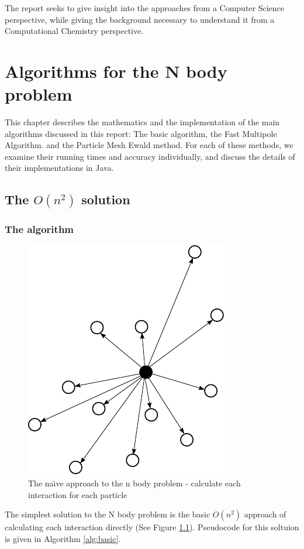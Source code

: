 \documentclass[pdftex,twoside,a4paper]{report}
\newcommand{\bcen}{\begin{center}}
\newcommand{\ecen}{\end{center}}
\newcommand{\pmem}{Particle Mesh Ewald method}
\newcommand{\fma}{Fast Multipole Algorithm}
\begin{document}
    The report seeks to give insight into the approaches from a Computer Science perspective, while giving the background necessary to understand it from a Computational Chemistry perspective.
    
    
    

\chapter{Algorithms for the N body problem}
This chapter describes the mathematics and the implementation of the main algorithms discussed in this report: The basic algorithm, the \fma{}. and the \pmem{}. For each of these methods, we examine their running times and accuracy individually, and discuss the details of their implementations in Java.
\section{The $O(n^2)$ solution}
\subsection{The algorithm}
        
\begin{figure}
\bcen \includegraphics{figures/nbodies.pdf} \ecen
\caption{The na\"{\i}ve approach to the n body problem - calculate each interaction for each particle}
\label{fig:basic_alg_diag}
\end{figure}

The simplest solution to the N body problem is the basic $O(n^2)$ approach of calculating each interaction directly (See Figure \ref{fig:basic_alg_diag}). Pseudocode for this soltuion is given in Algorithm \ref{alg:basic}.\\
\end{document}
